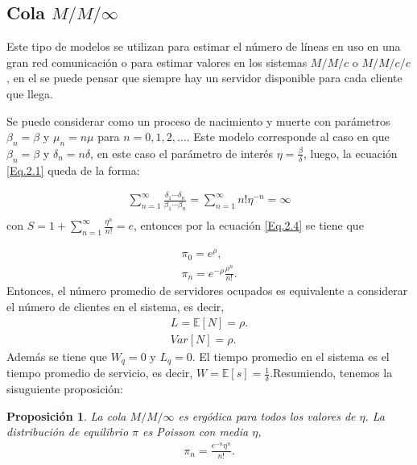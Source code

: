 \documentclass{article}
\newtheorem{Prop}{Proposición}[section]
\newcommand{\esp}{\mathbb{E}}
\numberwithin{equation}{section}
\begin{document}
\subsection{Cola $M/M/\infty$}
%

Este tipo de modelos se utilizan para estimar el n\'umero de l\'ineas en uso en una gran red comunicaci\'on o para estimar valores en los sistemas $M/M/c$ o $M/M/c/c$, en el se puede pensar que siempre hay un servidor disponible para cada cliente que llega.

Se puede considerar como un proceso de nacimiento y muerte con par\'ametros $\beta_{n}=\beta$ y $\mu_{n}=n\mu$ para $n=0,1,2,\ldots$. Este modelo corresponde al caso en que $\beta_{n}=\beta$ y $\delta_{n}=n\delta$, en este caso el par\'ametro de inter\'es $\eta=\frac{\beta}{\delta}$, luego, la ecuaci\'on \ref{Eq.2.1} queda de la forma:

\begin{eqnarray*}
\sum_{n=1}^{\infty}\frac{\delta_{1}\cdots\delta_{n}}{\beta_{1}\cdots\beta_{n}}=\sum_{n=1}^{\infty}n!\eta^{-n}=\infty\\
\end{eqnarray*}
con $S=1+\sum_{n=1}^{\infty}\frac{\eta^{n}}{n!}=e$, entonces por la ecuaci\'on \ref{Eq.2.4} se tiene que

\begin{eqnarray}\label{MMinf.pi}
\pi_{0}=e^{\rho},\\
\pi_{n}=e^{-\rho}\frac{\rho^{n}}{n!}.
\end{eqnarray}
Entonces, el n\'umero promedio de servidores ocupados es equivalente a considerar el n\'umero de clientes en el  sistema, es decir,
\begin{eqnarray}
L=\esp\left[N\right]=\rho.\\
Var\left[N\right]=\rho.
\end{eqnarray}
Adem\'as se tiene que $W_{q}=0$ y $L_{q}=0$. El tiempo promedio en el sistema es el tiempo promedio de servicio, es decir, $W=\esp\left[s\right]=\frac{1}{\delta}$.Resumiendo, tenemos la sisuguiente proposici\'on:

\begin{Prop}
La cola $M/M/\infty$ es erg\'odica para todos los valores de $\eta$. La distribuci\'on de equilibrio $\pi$ es Poisson con media $\eta$,
\begin{eqnarray}
\pi_{n}=\frac{e^{-n}\eta^{n}}{n!}.
\end{eqnarray}
\end{Prop}
%
\end{document}

